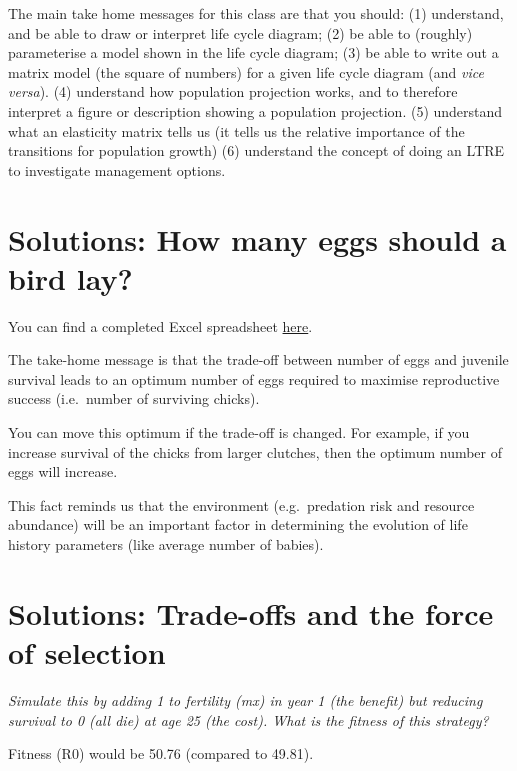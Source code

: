 \documentclass[
  a4paper]{book}
\begin{document}
The main take home messages for this class are that you should:
(1) understand, and be able to draw or interpret life cycle diagram;
(2) be able to (roughly) parameterise a model shown in the life cycle diagram;
(3) be able to write out a matrix model (the square of numbers) for a given life cycle diagram (and \emph{vice versa}).
(4) understand how population projection works, and to therefore interpret a figure or description showing a population projection.
(5) understand what an elasticity matrix tells us (it tells us the relative importance of the transitions for population growth)
(6) understand the concept of doing an LTRE to investigate management options.

\hypertarget{solutions-how-many-eggs-should-a-bird-lay}{%
\section{Solutions: How many eggs should a bird lay?}\label{solutions-how-many-eggs-should-a-bird-lay}}

You can find a completed Excel spreadsheet \href{https://www.dropbox.com/s/tcpxmdfvm35jzgr/How\%20many\%20eggs\%20-\%20answers.xlsx?dl=1}{here}.

The take-home message is that the trade-off between number of eggs and juvenile survival leads to an optimum number of eggs required to maximise reproductive success (i.e.~number of surviving chicks).

You can move this optimum if the trade-off is changed. For example, if you increase survival of the chicks from larger clutches, then the optimum number of eggs will increase.

This fact reminds us that the environment (e.g.~predation risk and resource abundance) will be an important factor in determining the evolution of life history parameters (like average number of babies).

\hypertarget{solutions-trade-offs-and-the-force-of-selection}{%
\section{Solutions: Trade-offs and the force of selection}\label{solutions-trade-offs-and-the-force-of-selection}}

\emph{Simulate this by adding 1 to fertility (mx) in year 1 (the benefit) but reducing survival to 0 (all die) at age 25 (the cost). What is the fitness of this strategy?}

Fitness (R0) would be 50.76 (compared to 49.81).
\end{document}

